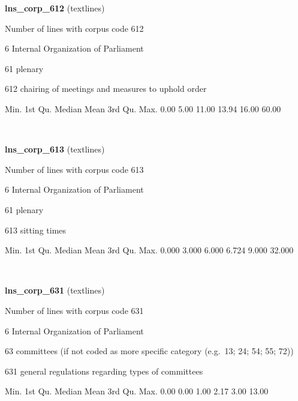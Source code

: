 \documentclass[]{article}
\newenvironment{Shaded}{\begin{snugshade}}{\end{snugshade}}
\newcommand{\FloatTok}[1]{\textcolor[rgb]{0.00,0.00,0.81}{{#1}}}
\newcommand{\NormalTok}[1]{{#1}}
\begin{document}
\textbf{lns\_corp\_612} (textlines)

Number of lines with corpus code 612

6 Internal Organization of Parliament

61 plenary

612 chairing of meetings and measures to uphold order

\begin{Shaded}
\begin{Highlighting}[]
   \NormalTok{Min. 1st Qu.  Median    Mean 3rd Qu.    Max. }
   \FloatTok{0.00}    \FloatTok{5.00}   \FloatTok{11.00}   \FloatTok{13.94}   \FloatTok{16.00}   \FloatTok{60.00} 
\end{Highlighting}
\end{Shaded}

~

\vspace{1em}

\textbf{lns\_corp\_613} (textlines)

Number of lines with corpus code 613

6 Internal Organization of Parliament

61 plenary

613 sitting times

\begin{Shaded}
\begin{Highlighting}[]
   \NormalTok{Min. 1st Qu.  Median    Mean 3rd Qu.    Max. }
  \FloatTok{0.000}   \FloatTok{3.000}   \FloatTok{6.000}   \FloatTok{6.724}   \FloatTok{9.000}  \FloatTok{32.000} 
\end{Highlighting}
\end{Shaded}

~

\vspace{1em}

\textbf{lns\_corp\_631} (textlines)

Number of lines with corpus code 631

6 Internal Organization of Parliament

63 committees (if not coded as more specific category (e.g.~13; 24; 54;
55; 72))

631 general regulations regarding types of committees

\begin{Shaded}
\begin{Highlighting}[]
   \NormalTok{Min. 1st Qu.  Median    Mean 3rd Qu.    Max. }
   \FloatTok{0.00}    \FloatTok{0.00}    \FloatTok{1.00}    \FloatTok{2.17}    \FloatTok{3.00}   \FloatTok{13.00} 
\end{Highlighting}
\end{Shaded}
\end{document}
